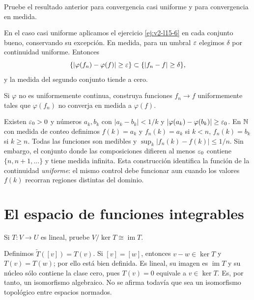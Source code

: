 \begin{ejercicio}\label{ej:v2-l15-7}
Pruebe el resultado anterior para convergencia casi uniforme y para convergencia en medida.
\end{ejercicio}
\begin{solucion}
En el caso casi uniforme aplicamos el ejercicio \ref{ej:v2-l15-6} en cada conjunto bueno, conservando su excepción. En medida, para un umbral $\varepsilon$ elegimos $\delta$ por continuidad uniforme. Entonces
\[\{|\varphi(f_n)-\varphi(f)|\ge\varepsilon\}\subset\{|f_n-f|\ge\delta\},
\]
y la medida del segundo conjunto tiende a cero.
\end{solucion}

\begin{ejercicio}\label{ej:v2-l15-8}
Si $\varphi$ no es uniformemente continua, construya funciones $f_n\to f$ uniformemente tales que $\varphi(f_n)$ no converja en medida a $\varphi(f)$.
\end{ejercicio}
\begin{solucion}
Existen $\varepsilon_0>0$ y números $a_k,b_k$ con $|a_k-b_k|<1/k$ y $|\varphi(a_k)-\varphi(b_k)|\ge\varepsilon_0$. En $\mathbb N$ con medida de conteo definimos $f(k)=a_k$ y $f_n(k)=a_k$ si $k<n$, $f_n(k)=b_k$ si $k\ge n$. Todas las funciones son medibles y $\sup_k|f_n(k)-f(k)|\le1/n$. Sin embargo, el conjunto donde las composiciones difieren al menos $\varepsilon_0$ contiene $\{n,n+1,\ldots\}$ y tiene medida infinita. Esta construcción identifica la función de la continuidad \emph{uniforme}: el mismo control debe funcionar aun cuando los valores $f(k)$ recorran regiones distintas del dominio.
\end{solucion}

\chapter{El espacio de funciones integrables}

\begin{ejercicio}\label{ej:v2-l13-1}
Si $T:V\to U$ es lineal, pruebe $V/\ker T\cong\operatorname{im}T$.
\end{ejercicio}
\begin{solucion}
Definimos $\widetilde T([v])=T(v)$. Si $[v]=[w]$, entonces $v-w\in\ker T$ y $T(v)=T(w)$; por ello está bien definida. Es lineal, su imagen es $\operatorname{im}T$ y su núcleo sólo contiene la clase cero, pues $T(v)=0$ equivale a $v\in\ker T$. Es, por tanto, un isomorfismo algebraico. No se afirma todavía que sea un isomorfismo topológico entre espacios normados.
\end{solucion}

